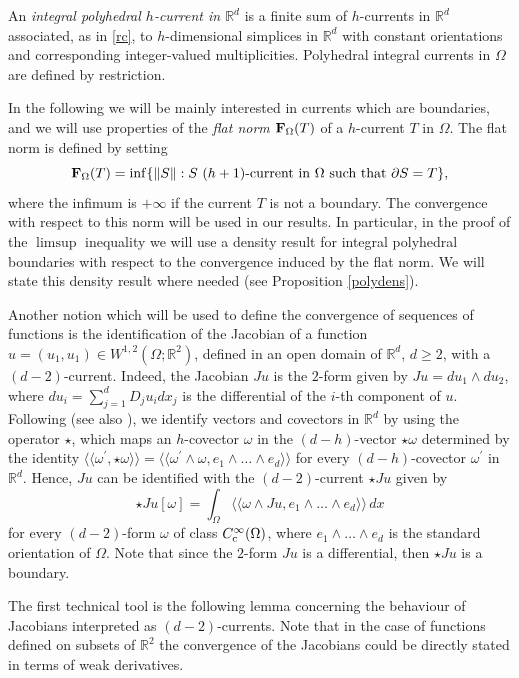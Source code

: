 \documentclass[11pt]{article}
\begin{document}
An {\em integral polyhedral $h$-current in $\mathbb R^d$} is a finite sum of $h$-currents in $\mathbb R^d$ associated, as in \eqref{rc}, to $h$-dimensional simplices in $\mathbb R^d$ with constant orientations and corresponding integer-valued multiplicities. Polyhedral integral currents in $\Omega$ are defined by restriction. 

In the following we will be mainly interested in currents which are boundaries, and we will use properties of the {\em flat norm} ${\bf F}_{\Omega}(T)$ of a $h$-current $T$ in $\Omega$. The flat norm is defined by setting 
$${\bf F}_{\Omega}(T)=\inf\{\|S\|: S \ (h+1)\hbox{\rm-current in $\Omega $ such that } \partial S=T\},$$ 
where the infimum is $+\infty$ if the current $T$ is not a boundary. 
The convergence with respect to this norm will be used in our results. 
In particular, in the proof of the $\limsup$ inequality we will use a density result for integral polyhedral boundaries with respect to the convergence induced by the flat norm. We will state this density result 
where needed (see Proposition \ref{polydens}). 

Another notion which will be used to define the convergence of sequences of functions is the identification of the Jacobian of a function $u=(u_1,u_1)\in W^{1,2}(\Omega;\mathbb R^2)$, defined in an open domain of $\mathbb R^d$, $d\geq 2$, with a $(d-2)$-current. Indeed, the Jacobian $Ju$ is the $2$-form given by $Ju=du_1\wedge du_2$, where $du_i=\sum_{j=1}^d D_ju_i dx_j$ is the differential of the $i$-th component of $u$. 
Following \cite{ABS} (see also \cite{JS}), we identify vectors and covectors in $\mathbb R^d$ by using the operator $\star$, which maps an $h$-covector $\omega$ in the $(d-h)$-vector $\star\omega$ determined  by the identity 
$\langle\!\langle\omega^\prime,\star\omega\rangle\!\rangle=\langle\!\langle \omega^\prime\wedge\omega, e_1\wedge\dots\wedge e_d \rangle\!\rangle$  
for every $(d-h)$-covector $\omega^\prime$ in $\mathbb R^d$. 
Hence, $Ju$ can be identified with the $(d-2)$-current $\star Ju$ given by 
$$\star Ju[\omega]=\int_\Omega\langle\!\langle \omega\wedge Ju, e_1\wedge\dots\wedge e_d\rangle\!\rangle\, dx$$ 
for every $(d-2)$-form $\omega$ of class $C^\infty_{\rm c}(\Omega)$, where $e_1\wedge\dots\wedge e_d$ is the standard orientation of $\Omega$. Note that since the $2$-form $Ju$ is a differential, then $\star Ju$ is a boundary.  

\smallskip
 The first technical tool is the following lemma concerning the behaviour of Jacobians interpreted as $(d-2)$-currents. 
Note that in the case of functions defined on subsets of $\mathbb R^2$ the convergence of the Jacobians could be directly stated in terms of weak derivatives. 
\end{document}
